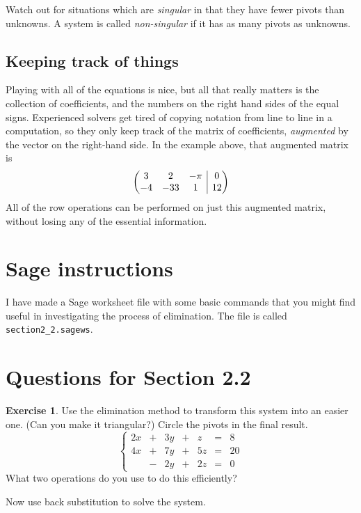 \documentclass[11pt]{amsart}
\makeatletter
\theoremstyle{definition}
\newtheorem{exercise}{Exercise}
\newenvironment{amatrix}[1]{%
  \left(\begin{array}{@{}*{#1}{c}|c@{}}
}{%
  \end{array}\right)
}
\makeatother
\begin{document}
Watch out for situations which are \emph{singular} in that they have fewer pivots than unknowns. A system is called \emph{non-singular} if it has as many pivots as unknowns.

\subsection{Keeping track of things}

Playing with all of the equations is nice, but all that really matters is the collection of coefficients, and the numbers on the right hand sides of the equal signs.
Experienced solvers get tired of copying notation from line to line in a computation, so they only keep track of the matrix of coefficients, \emph{augmented} by the vector on the right-hand side. In the example above, that augmented matrix is
\[
\begin{amatrix}{3}
3 & 2 & -\pi & 0 \\ -4 & -33 & 1 & 12
\end{amatrix}
\]
All of the row operations can be performed on just this augmented matrix, without losing any of the essential information.


\section{Sage instructions}

I have made a Sage worksheet file with some basic commands that you might find useful in investigating the process of elimination. The file is called \texttt{section2\_2.sagews}.


\section{Questions for Section 2.2}
\setcounter{exercise}{35}

\begin{exercise}
Use the elimination method to transform this system into an easier one. (Can you make it triangular?) Circle the pivots in the final result.
\[
\left\{
\begin{array}{rrrrrrr}
2x & + & 3y & + &  z & = & 8\\
4x & + & 7y & + & 5z & = & 20 \\
   & - & 2y & + & 2z & = & 0
\end{array}
\right.
\]
What two operations do you use to do this efficiently?

Now use back substitution to solve the system.
\end{exercise}
\end{document}
